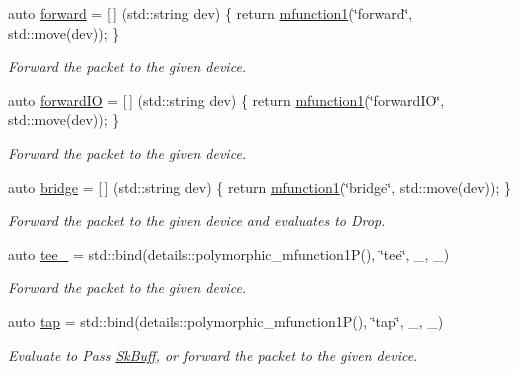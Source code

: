 \begin{DoxyCompactItemize}
auto \hyperlink{namespacepfq_1_1lang_1_1anonymous__namespace_02default_8hpp_03_aae08247030fea0f5e398b0a03d382257}{forward} = \mbox{[}$\,$\mbox{]} (std\+::string dev) \{ return \hyperlink{namespacepfq_1_1lang_a68d775c68562fbd0ab9ef213f2519499}{mfunction1}(\char`\"{}forward\char`\"{}, std\+::move(dev)); \}
\begin{DoxyCompactList}\small\item\em Forward the packet to the given device. \end{DoxyCompactList}\item 
auto \hyperlink{namespacepfq_1_1lang_1_1anonymous__namespace_02default_8hpp_03_a3fb6ec42e38c3329534ea3a7024fd967}{forward\+I\+O} = \mbox{[}$\,$\mbox{]} (std\+::string dev) \{ return \hyperlink{namespacepfq_1_1lang_a68d775c68562fbd0ab9ef213f2519499}{mfunction1}(\char`\"{}forward\+I\+O\char`\"{}, std\+::move(dev)); \}
\begin{DoxyCompactList}\small\item\em Forward the packet to the given device. \end{DoxyCompactList}\item 
auto \hyperlink{namespacepfq_1_1lang_1_1anonymous__namespace_02default_8hpp_03_ad318dd8fb6441b78bdfb056173e5a7e2}{bridge} = \mbox{[}$\,$\mbox{]} (std\+::string dev) \{ return \hyperlink{namespacepfq_1_1lang_a68d775c68562fbd0ab9ef213f2519499}{mfunction1}(\char`\"{}bridge\char`\"{}, std\+::move(dev)); \}
\begin{DoxyCompactList}\small\item\em Forward the packet to the given device and evaluates to {\ttfamily Drop}. \end{DoxyCompactList}\item 
auto \hyperlink{namespacepfq_1_1lang_1_1anonymous__namespace_02default_8hpp_03_aa4d28339a059595643ad1b7a30dc887f}{tee\+\_\+} = std\+::bind(details\+::polymorphic\+\_\+mfunction1\+P(), \char`\"{}tee\char`\"{}, \+\_, \+\_)
\begin{DoxyCompactList}\small\item\em Forward the packet to the given device. \end{DoxyCompactList}\item 
auto \hyperlink{namespacepfq_1_1lang_1_1anonymous__namespace_02default_8hpp_03_abeef983e47756eaabd5033e4561f1ff0}{tap} = std\+::bind(details\+::polymorphic\+\_\+mfunction1\+P(), \char`\"{}tap\char`\"{}, \+\_, \+\_)
\begin{DoxyCompactList}\small\item\em Evaluate to {\ttfamily Pass} \hyperlink{structpfq_1_1lang_1_1SkBuff}{Sk\+Buff}, or forward the packet to the given device. \end{DoxyCompactList}\item 

\end{DoxyCompactItemize}

